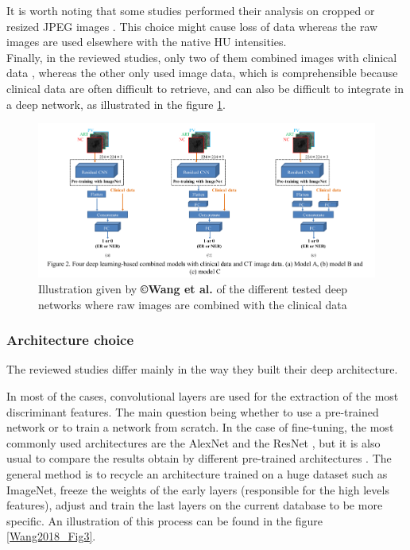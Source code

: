 It is worth noting that some studies performed their analysis on cropped or
resized JPEG images \cite{Yasaka2018,Yasaka2018a,WANG2019}. 
This choice might cause loss of data whereas the raw images are used elsewhere with the native HU intensities.\\
Finally, in the reviewed studies, only two of them combined images with
clinical data \cite{Yasaka2018a,WANG2019}, whereas the other only used image data, which is
comprehensible because clinical data are often difficult to retrieve,
and can also be difficult to integrate in a deep network, as illustrated
in the figure \ref{Wang2019_Fig2}.
\begin{figure}[th!]
\centering
\includegraphics[width=1.0\linewidth]{images/image5}
\caption{Illustration given by \textbf{©Wang et al.} of the different tested deep networks where raw images are combined with the clinical data \cite{WANG2019}}
\label{Wang2019_Fig2}
\end{figure}


\subsubsection{Architecture choice}\label{architecure-choice}



The reviewed studies differ mainly in the way they built their deep
architecture.

In most of the cases, convolutional layers are used for the extraction
of the most discriminant features. The main question being whether to
use a pre-trained network or to train a network from scratch. In the
case of fine-tuning, the most commonly used architectures are the
AlexNet and the ResNet \cite{WANG2019,Wang2018,Yamada2019,Peng2020}, but it is also usual to
compare the results obtain by different pre-trained architectures \cite{WANG2019,Yamada2019}. The general method
is to recycle an architecture trained on a huge dataset such as
ImageNet, freeze the weights of the early layers (responsible for the
high levels features), adjust and train the last layers on the current
database to be more specific.
An illustration of this process can be found in the figure \ref{Wang2018_Fig3}.

